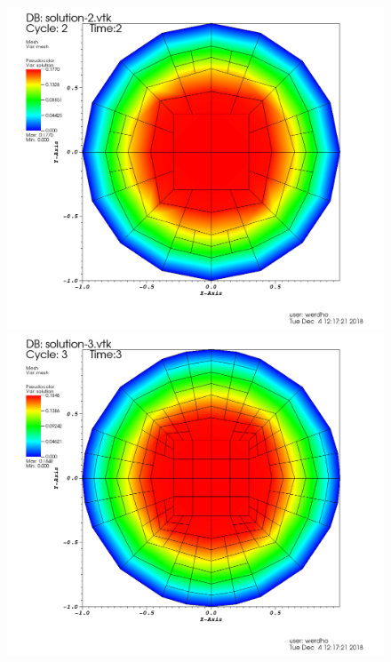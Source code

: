 \documentclass[11pt,fullpage]{article}
\theoremstyle{lemma}
\theoremstyle{definition}
\theoremstyle{lemma}
\begin{document}
\begin{figure}[!ht]
\begin{minipage}{.45\paperwidth}
		\centering
		\includegraphics[scale=.12]{Step6-3.png}
	\end{minipage}%
	\begin{minipage}{.4\paperwidth}
		\centering
		\includegraphics[scale=.12]{Step6-4.png}
	\end{minipage}
\end{figure}
\end{document}
